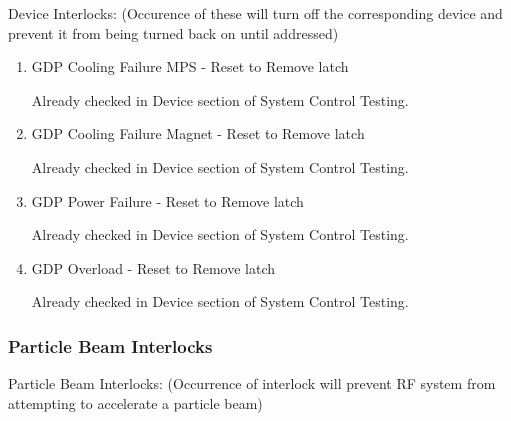 \documentclass[11pt]{book}		%
\begin{document}
Device Interlocks:
(Occurence of these will turn off the corresponding device and prevent it from being turned back on until addressed)

\begin{enumerate}
 \item GDP Cooling Failure MPS - Reset to Remove latch

\color{red}
Already checked in Device section of System Control Testing.
\color{black}

 \item GDP Cooling Failure Magnet - Reset to Remove latch

\color{red}
Already checked in Device section of System Control Testing.
\color{black}

 \item GDP Power Failure - Reset to Remove latch

\color{red}
Already checked in Device section of System Control Testing.
\color{black}

 \item GDP Overload - Reset to Remove latch

\color{red}
Already checked in Device section of System Control Testing.
\color{black}

\end{enumerate}

\subsubsection{Particle Beam Interlocks}

Particle Beam Interlocks:
(Occurrence of interlock will prevent RF system from attempting to accelerate a particle beam)
\end{document}
